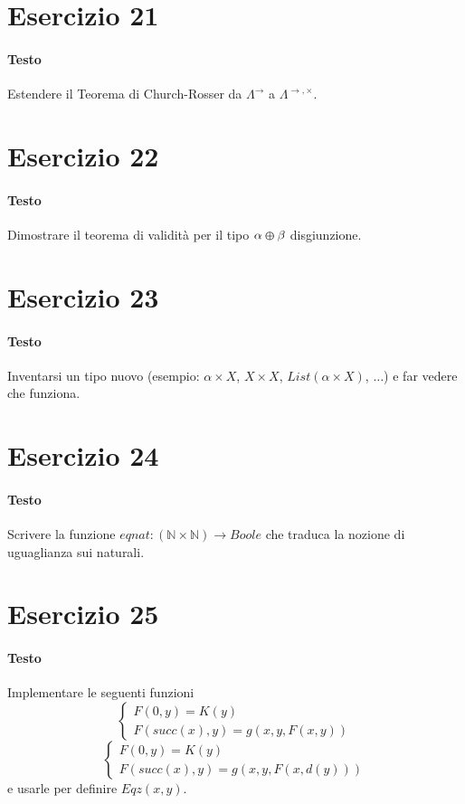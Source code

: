 \documentclass[a4paper,10pt]{article}
\begin{document}
\section*{Esercizio 21}
\paragraph{Testo}
Estendere il Teorema di Church-Rosser da $\Lambda^\rightarrow$ a $\Lambda^{\rightarrow, \times}$.

\section*{Esercizio 22}
\paragraph{Testo}
Dimostrare il teorema di validità per il tipo $\alpha \varoplus \beta$ disgiunzione.

\section*{Esercizio 23}
\paragraph{Testo}
Inventarsi un tipo nuovo (esempio: $\alpha \times X$, $X \times X$, $List(\alpha \times X)$, $\dots$) e far vedere che funziona.

\section*{Esercizio 24}
\paragraph{Testo}
Scrivere la funzione $eqnat : (\mathbb{N} \times \mathbb{N}) \rightarrow Boole$ che traduca la nozione di uguaglianza sui naturali.

\section*{Esercizio 25}
\paragraph{Testo}
Implementare le seguenti funzioni
$$\begin{cases} F(0,y) = K(y) \\ F(succ(x),y) = g(x,y,F(x,y)) \end{cases}$$
$$\begin{cases} F(0,y) = K(y) \\ F(succ(x),y) = g(x,y,F(x,d(y))) \end{cases}$$
e usarle per definire $Eqz(x,y)$.
\end{document}
